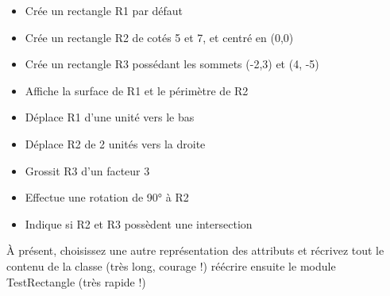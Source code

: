 \liststyleListi
\begin{itemize}
\item {
Crée un rectangle R1 par défaut}
\item {
Crée un rectangle R2 de cotés 5 et 7, et centré en (0,0)}
\item {
Crée un rectangle R3 possédant les sommets (-2,3) et (4, -5)}
\item {
Affiche la surface de R1 et le périmètre de R2}
\item {
Déplace R1 d’une unité vers le bas}
\item {
Déplace R2 de 2 unités vers la droite}
\item {
Grossit R3 d’un facteur 3}
\item {
Effectue une rotation de 90° à R2}
\item {
Indique si R2 et R3 possèdent une intersection}
\end{itemize}
{
À présent, choisissez une autre représentation des attributs et récrivez
tout le contenu de la classe (très long, courage !) réécrire ensuite le
module TestRectangle (très rapide !)}
